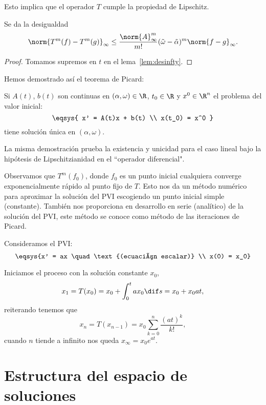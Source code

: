 \documentclass[../main.tex]{subfiles}
\begin{document}
Esto implica que el operador \(T\) cumple la propiedad de Lipschitz.

\begin{corollary}
	Se da la desigualdad
	\[\norm{T^m(f) - T^m(g)}_\infty \leq 
		\frac{\norm{A}^m_\infty}{m!} (\tilde{\omega} - \tilde{\alpha})^m
		\norm{f - g}_\infty.\]
\end{corollary}

\begin{proof}
	Tomamos supremos en \(t\) en el lema~\ref{lem:desinfty}.
\end{proof}

Hemos demostrado así el teorema de Picard:

\begin{theorem}[Picard]
	Si \(A(t)\), \(b(t)\) son continuas en \((\alpha, \omega) \in \R\), 
	\(t_0 \in \R\) y \(x^0 \in \R^n\) el problema del valor inicial:
	\[\eqsys{
		x' = A(t)x + b(t) \\
		x(t_0) = x^0
		}\]
	tiene solución única en \((\alpha, \omega)\).
\end{theorem}

\begin{remark}
	La misma demostración prueba la existencia y unicidad para el caso lineal
	bajo la hipótesis de Lipschitzianidad en el ``operador diferencial".
\end{remark}

Observamos que \(T^m(f_0)\), donde \(f_0\) es un punto inicial cualquiera
converge exponencialmente rápido al punto fijo de \(T\). Esto nos da un método
numérico para aproximar la solución del PVI escogiendo un punto inicial simple
(constante). También nos proporciona en desarrollo en serie (analítico) de la
solución del PVI, este método se conoce como método de las iteraciones de
Picard.

\begin{example}
	Consideramos el PVI:
	\[\eqsys{x' = ax \quad \text{(ecuación escalar)} \\
		x(0) = x_0}\]

	Iniciamos el proceso con la solución constante \(x_0\), 
	\[x_1 = T(x_0) = x_0 + \int_0^t a x_0 \dif s = x_0 + x_0 a t,\]
	reiterando tenemos que
	\[x_n = T(x_{n - 1}) = x_0 \sum_{k = 0}^n \frac{(at)^k}{k!},\]
	cuando \(n\) tiende a infinito nos queda \(x_\infty = x_0 e^{at}\).
\end{example}

\section{Estructura del espacio de soluciones}
\end{document}
